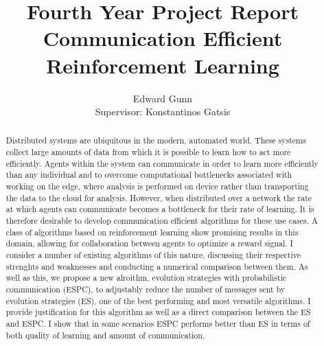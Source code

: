 \documentclass[letterpaper,11pt]{report}
\begin{document}
\title{Fourth Year Project Report \\ \textbf{Communication Efficient Reinforcement Learning}}
\author{Edward Gunn \\ Supervisor: Konstantinos Gatsis}
\maketitle 

\begin{abstract}
    Distributed systems are ubiquitous in the modern, automated world.
    These systems collect large amounts of data from which it is possible to learn how to act more efficiently.
    Agents within the system can communicate in order to learn more efficiently than any individual and to overcome computational bottlenecks associated with working on the edge, where analysis is performed on device rather than transporting the data to the cloud for analysis.
    However, when distributed over a network the rate at which agents can communicate becomes a bottleneck for their rate of learning.
    It is therefore desirable to develop communication efficient algorithms for these use cases. A class of algorithms based on reinforcement learning show promising results in this domain, allowing for collaboration between agents to optimize a reward signal. I consider a number of existing algorithms of this nature, discussing their respective strenghts and weaknesses and conducting a numerical comparison between them. As well as this, we propose a new alroithm, evolution strategies with probabilistic communication (ESPC), to adjustably reduce the number of messages sent by evolution strategies (ES), one of the best performing and most versatile algorithms. I provide justification for this algorithm as well as a direct comparison between the ES and ESPC. I show that in some scenarios ESPC performs better than ES in terms of both quality of learning and amount of communication.
\end{abstract}

\tableofcontents











% 
\end{document}
